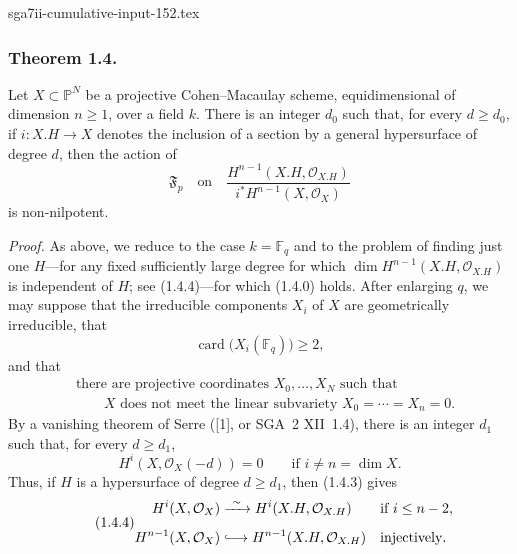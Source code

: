 \begin{filecontents*}{sga7ii-cumulative-input-152.tex}
\subsubsection*{Theorem 1.4.}
Let $X\subset\mathbb P^N$ be a projective Cohen--Macaulay scheme,
equidimensional of dimension $n\geq1$, over a field $k$.  There is an
integer $d_0$ such that, for every $d\geq d_0$, if
$i:X.H\longrightarrow X$ denotes the inclusion of a section by a general
hypersurface of degree $d$, then the action of
\begin{equation}\tag{1.4.0}
\mathfrak F_p\quad\text{on}\quad
\frac{H^{n-1}(X.H,\mathcal O_{X.H})}
     {i^*H^{n-1}(X,\mathcal O_X)}
\end{equation}
is non-nilpotent.

\medskip
\noindent\emph{Proof.}
As above, we reduce to the case $k=\mathbb F_q$ and to the problem of
finding just one $H$---for any fixed sufficiently large degree for which
$\dim H^{n-1}(X.H,\mathcal O_{X.H})$ is independent of $H$; see
(1.4.4)---for which (1.4.0) holds.  After enlarging $q$, we may suppose
that the irreducible components $X_i$ of $X$ are geometrically irreducible,
that
\begin{equation}\tag{1.4.1}
\operatorname{card}\bigl(X_i(\mathbb F_q)\bigr)\geq2,
\end{equation}
and that
\begin{equation}\tag{1.4.2}
\begin{aligned}
&\text{there are projective coordinates }X_0,\dots,X_N\text{ such that}\\
&\qquad X\text{ does not meet the linear subvariety }
X_0=\cdots=X_n=0.
\end{aligned}
\end{equation}
By a vanishing theorem of Serre ([1], or SGA~2 XII~1.4), there is an
integer $d_1$ such that, for every $d\geq d_1$,
\begin{equation}\tag{1.4.3}
H^i(X,\mathcal O_X(-d))=0\qquad\text{if }i\ne n=\dim X.
\end{equation}
Thus, if $H$ is a hypersurface of degree $d\geq d_1$, then (1.4.3) gives
\begin{equation}\tag{1.4.4}
\begin{aligned}
H^i(X,\mathcal O_X)&\xrightarrow{\ \sim\ }
 H^i(X.H,\mathcal O_{X.H}) &&\text{if }i\leq n-2,\\[1ex]
H^{n-1}(X,\mathcal O_X)&\lhook\joinrel\longrightarrow
 H^{n-1}(X.H,\mathcal O_{X.H}) &&\text{injectively}.
\end{aligned}
\end{equation}


\end{filecontents*}
